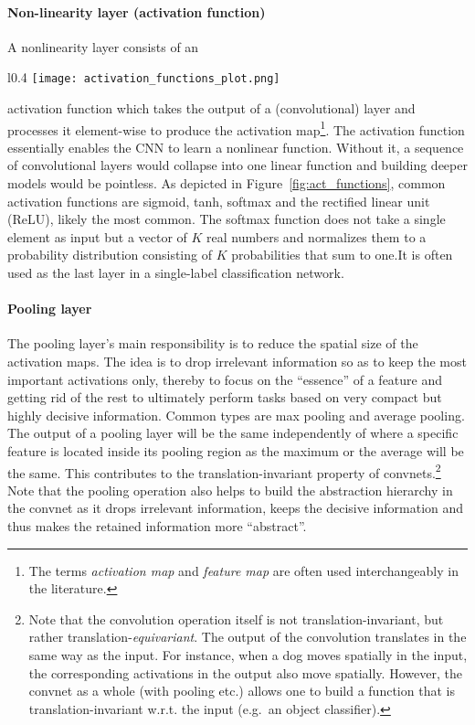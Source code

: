 \documentclass[a4paper,12pt]{report}
\begin{document}
\paragraph{Non-linearity layer (activation function)} A nonlinearity layer consists of an 
\begin{wrapfigure}{l}{0.4\textwidth}
\texttt{[image: activation\_functions\_plot.png]}
\caption{Common activation functions.}
\label{fig:act_functions}
\end{wrapfigure}
activation function which takes the output of a (convolutional) layer and processes it element-wise to produce the activation map\footnote{The terms \textit{activation map} and \textit{feature map} are often used interchangeably in the literature.}. The activation function essentially enables the CNN to learn a nonlinear function. Without it, a sequence of convolutional layers would collapse into one linear function and building deeper models would be pointless. As depicted in Figure~\ref{fig:act_functions}, common activation functions are sigmoid, tanh, softmax and the rectified linear unit (ReLU), likely the most common. The softmax function does not take a single element as input but a vector of $K$ real numbers and normalizes them to a probability distribution consisting of $K$ probabilities that sum to one.It is often used as the last layer in a single-label classification network.

\paragraph{Pooling layer            } The pooling layer's main responsibility is to reduce the spatial size of the activation maps. The idea is to drop irrelevant information so as to keep the most important activations only, thereby to focus on the ``essence'' of a feature and getting rid of the rest to ultimately perform tasks based on very compact but highly decisive information. Common types are max pooling and average pooling. The output of a pooling layer will be the same independently of where a specific feature is located inside its pooling region as the maximum or the average will be the same. This contributes to the translation-invariant property of convnets.\footnote{Note that the convolution operation itself is not translation-invariant, but rather translation-\textit{equivariant}. The output of the convolution translates in the same way as the input. For instance, when a dog moves spatially in the input, the corresponding activations in the output also move spatially. However, the convnet as a whole  (with pooling etc.) allows one to build a function that is translation-invariant w.r.t. the input (e.g.\ an object classifier).} Note that the pooling operation also helps to build the abstraction hierarchy in the convnet as it drops irrelevant information, keeps the decisive information and thus makes the retained information more ``abstract''. 
\end{document}
